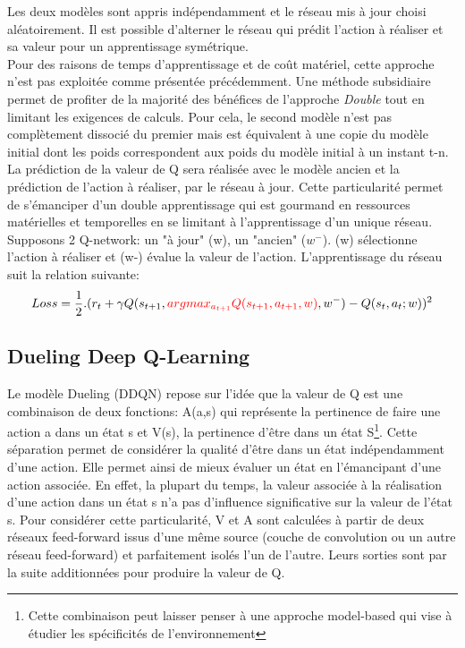 \noindent Les deux modèles sont appris indépendamment et le réseau mis à jour choisi aléatoirement. Il est possible d'alterner le réseau qui prédit l'action à réaliser et sa valeur pour un apprentissage symétrique.\\

\noindent Pour des raisons de temps d'apprentissage et de coût matériel, cette approche n'est pas exploitée comme présentée précédemment. Une méthode subsidiaire permet de profiter de la majorité des bénéfices de l'approche \textit{Double} tout en limitant les exigences de calculs. Pour cela, le second modèle n'est pas complètement dissocié du premier mais est équivalent à une copie du modèle initial dont les poids correspondent aux poids du modèle initial à un instant t-n. La prédiction de la valeur de Q sera réalisée avec le modèle ancien et la prédiction de l'action à réaliser, par le réseau à jour. Cette particularité permet de s'émanciper d'un double apprentissage qui est gourmand en ressources matérielles et temporelles en se limitant à l'apprentissage d'un unique réseau.\\

\noindent Supposons 2 Q-network: un "à jour" (w), un "ancien" ($w^-$). (w) sélectionne l'action à réaliser et (w-) évalue la valeur de l'action. L'apprentissage du réseau suit la relation suivante:
$$Loss=\frac{1}{2}.(r_t+\gamma Q(s_{t+1},\textcolor{red}{argmax_{a_{t+1}}Q(s_{t+1},a_{t+1},w)},w^-)-Q(s_t,a_t;w))^2$$

\subsection{Dueling Deep Q-Learning}
\noindent Le modèle Dueling (DDQN)\cite{dudqn} repose sur l'idée que la valeur de Q est une combinaison de deux fonctions: A(a,s) qui représente la pertinence de faire une action a dans un état s et V(s), la pertinence d'être dans un état S\footnote{Cette combinaison peut laisser penser à une approche model-based qui vise à étudier les spécificités de l'environnement}. Cette séparation permet de considérer la qualité d'être dans un état indépendamment d'une action. Elle permet ainsi de mieux évaluer un état en l'émancipant d'une action associée. En effet, la plupart du temps, la valeur associée à la réalisation d'une action dans un état s n'a pas d'influence significative sur la valeur de l'état s. Pour considérer cette particularité, V et A sont calculées à partir de deux réseaux feed-forward issus d'une même source (couche de convolution ou un autre réseau feed-forward) et parfaitement isolés l'un de l'autre. Leurs sorties sont par la suite additionnées pour produire la valeur de Q.\\

